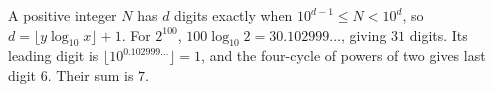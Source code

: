 A positive integer $N$ has $d$ digits exactly when $10^{d-1}\le N<10^d$, so $\boxed{d=\lfloor y\log_{10}x\rfloor+1}$. For $2^{100}$, $100\log_{10}2=30.102999\ldots$, giving $31$ digits. Its leading digit is $\lfloor10^{0.102999\ldots}\rfloor=1$, and the four-cycle of powers of two gives last digit $6$. Their sum is $\boxed7$.
